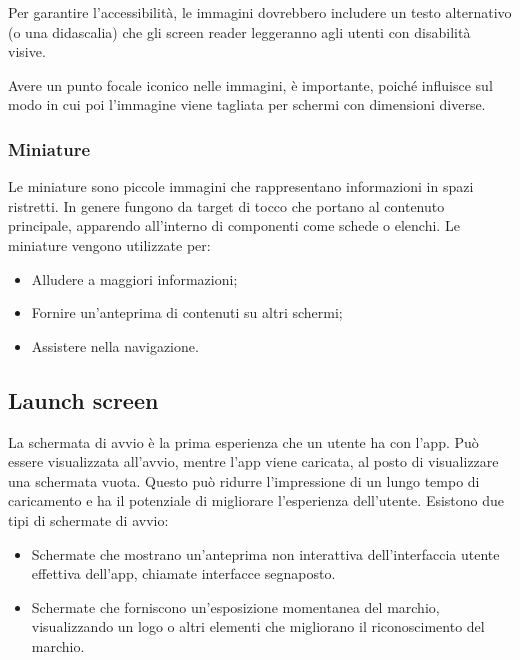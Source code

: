 \documentclass[12pt, a4paper]{report}
\begin{document}
	Per garantire l'accessibilità, le immagini dovrebbero includere un testo alternativo (o una didascalia) che gli screen reader leggeranno agli utenti con disabilità visive.

	Avere un punto focale iconico nelle immagini, è importante, poiché influisce sul modo in cui poi l’immagine viene tagliata per schermi con dimensioni diverse.


	\subsubsection{Miniature}
	Le miniature sono piccole immagini che rappresentano informazioni in spazi ristretti. In genere fungono da target di tocco che portano al contenuto principale, apparendo all'interno di componenti come schede o elenchi. Le miniature vengono utilizzate per:
	\begin{itemize}
		\item Alludere a maggiori informazioni;
		\item Fornire un’anteprima di contenuti su altri schermi;
		\item Assistere nella navigazione.
	\end{itemize}

	\subsection{Launch screen}
	La schermata di avvio è la prima esperienza che un utente ha con l’app. Può essere visualizzata all'avvio, mentre l’app viene caricata, al posto di visualizzare una schermata vuota. Questo può ridurre
	l’impressione di un lungo tempo di caricamento e ha il potenziale di migliorare l'esperienza dell'utente. Esistono due tipi di schermate di avvio:
	\begin{itemize}
		\item Schermate che mostrano un'anteprima non interattiva dell'interfaccia utente effettiva dell'app, chiamate interfacce segnaposto.
		\item Schermate che forniscono un'esposizione momentanea del marchio, visualizzando un logo o altri elementi che migliorano il riconoscimento del marchio.
	\end{itemize}
\end{document}
